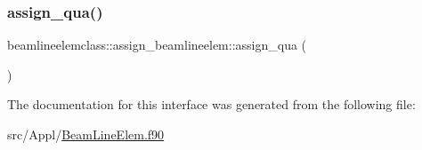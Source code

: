 \subsubsection{\texorpdfstring{assign\_qua()}{assign\_qua()}}
{\footnotesize\ttfamily beamlineelemclass\+::assign\+\_\+beamlineelem\+::assign\+\_\+qua (\begin{DoxyParamCaption}{ }\end{DoxyParamCaption})}



The documentation for this interface was generated from the following file\+:\begin{DoxyCompactItemize}
\item 
src/\+Appl/\mbox{\hyperlink{_beam_line_elem_8f90}{Beam\+Line\+Elem.\+f90}}\end{DoxyCompactItemize}
